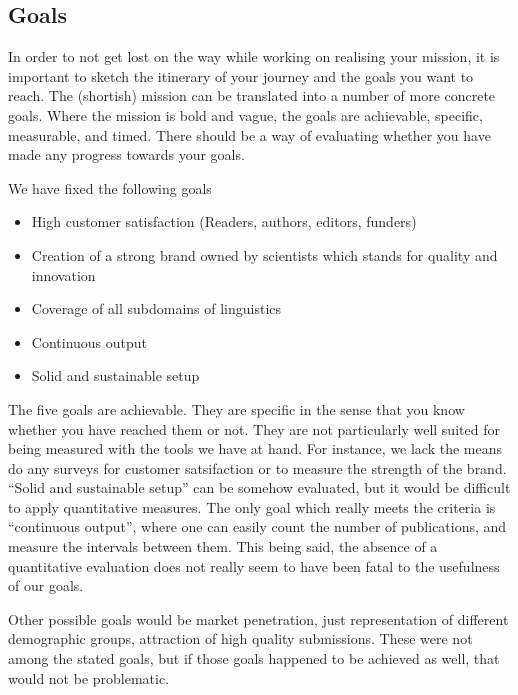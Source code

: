 \documentclass[output=guidelines,nonflat,smallfont,
draftmode
]{langsci/langscibook}
\newcommand{\background}[1]{ 
  \vspace{5mm}
  \renewcommand{\tblslinecolour}{lsDarkBlue}
  \tblssy[red]{explore2}{Background}{\vspace*{-5mm}#1}
}
\newcommand{\langscisolution}[1]{
  \renewcommand{\tblslinecolour}{lsLightBlue}
  \tblssy{langsci}{LangSci solution}{\vspace*{-5mm}#1}
}
\newcommand{\evaluation}[1]{
  \renewcommand{\tblslinecolour}{lsLightOrange}
  \tblssy{receipt}{Evaluation}{\vspace*{-5mm}#1}
}
\newcommand{\othersolutions}[1]{
  \renewcommand{\tblslinecolour}{lsDarkGreenOne}
  \tblssy{more}{Other solutions}{\vspace*{-5mm}#1}
}
\renewcommand{\tblssy}[4][black!12]{%
  \renewcommand{\langscisymbol}{#2}\renewcommand{\tblsboxcolor}{#1}
  \begin{mdframed}[style=yellowexercise,frametitle={#3}]
    #4
  \end{mdframed}
}
\begin{document}
\subsection{Goals}
\background{In order to not get lost on the way while working on realising your mission, it is important to sketch the itinerary of your journey and the goals you want to reach. The (shortish) mission can be translated into a number of more concrete goals. Where the mission is bold and vague, the goals are achievable, specific, measurable, and timed. There should be a way of evaluating whether you have made any progress towards your goals.}
\langscisolution{
We have fixed the following goals
\begin{itemize}
\item High customer satisfaction (Readers, authors, editors, funders)
\item Creation of a strong brand owned by scientists which stands for quality and innovation
\item Coverage of all subdomains of linguistics
\item Continuous output
\item Solid and sustainable setup
\end{itemize} 
}
\evaluation{
The five goals are achievable. They are specific in the sense that you know whether you have reached them or not. They are not particularly well suited for being measured with the tools we have at hand. For instance,  we lack the means do any surveys for customer satsifaction or to measure the strength of the brand. ``Solid and sustainable setup'' can be somehow evaluated, but it would be difficult to apply quantitative measures. The only goal which really meets the criteria is ``continuous output'', where one can easily count the number of publications, and measure the intervals between them. This being said, the absence of a quantitative evaluation does not really seem to have been fatal to the usefulness of our goals. 
}
\othersolutions{
Other possible goals would be market penetration, just representation of different demographic groups, attraction of high quality submissions. These were not among the stated goals, but if those goals happened to be achieved as well, that would not  be problematic.
} 
\end{document}
